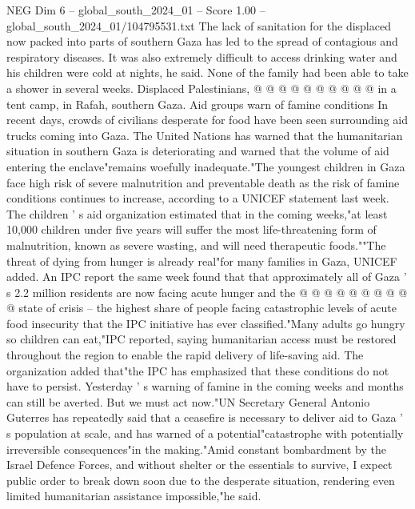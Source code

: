\begin{textsample}{NEG Dim 6 – global\_south\_2024\_01 – Score 1.00 – global\_south\_2024\_01/104795531.txt}
The lack of sanitation for the displaced now packed into parts of southern Gaza has led to the spread of contagious and respiratory diseases.
It was also extremely difficult to access drinking water and his children were cold at nights, he said.
None of the family had been able to take a shower in several weeks.
Displaced Palestinians, @ @ @ @ @ @ @ @ @ @ in a tent camp, in Rafah, southern Gaza.
Aid groups warn of famine conditions In recent days, crowds of civilians desperate for food have been seen surrounding aid trucks coming into Gaza.
The United Nations has warned that the humanitarian situation in southern Gaza is deteriorating and warned that the volume of aid entering the enclave"remains woefully inadequate."The youngest children in Gaza face high risk of severe malnutrition and preventable death as the risk of famine conditions continues to increase, according to a UNICEF statement last week.
The children ' s aid organization estimated that in the coming weeks,"at least 10,000 children under five years will suffer the most life-threatening form of malnutrition, known as severe wasting, and will need therapeutic foods.""The threat of dying from hunger is already real"for many families in Gaza, UNICEF added.
An IPC report the same week found that that approximately all of Gaza ' s 2.2 million residents are now facing acute hunger and the @ @ @ @ @ @ @ @ @ @ state of crisis -- the highest share of people facing catastrophic levels of acute food insecurity that the IPC initiative has ever classified."Many adults go hungry so children can eat,"IPC reported, saying humanitarian access must be restored throughout the region to enable the rapid delivery of life-saving aid.
The organization added that"the IPC has emphasized that these conditions do not have to persist.
Yesterday ' s warning of famine in the coming weeks and months can still be averted.
But we must act now."UN Secretary General Antonio Guterres has repeatedly said that a ceasefire is necessary to deliver aid to Gaza ' s population at scale, and has warned of a potential"catastrophe with potentially irreversible consequences"in the making."Amid constant bombardment by the Israel Defence Forces, and without shelter or the essentials to survive, I expect public order to break down soon due to the desperate situation, rendering even limited humanitarian assistance impossible,"he said.

\end{textsample}
